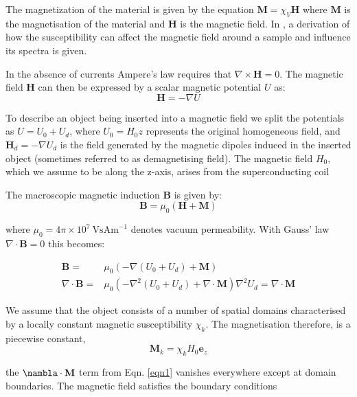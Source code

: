 The magnetization of the material is given by the equation $\mathbf{M} = \chi_V \mathbf{H}$
where $\mathbf{M}$ is the magnetisation of the material and $\mathbf{H}$ is the magnetic field. In
\citep{RN118}, a derivation of how the susceptibility can affect the magnetic field around a sample
and influence its spectra is given.

In the absence of currents Ampere’s law requires that $\nabla \times \mathbf{H} = 0$. The magnetic field $\mathbf{H}$
can then be expressed by a scalar magnetic potential $U$ as:
\begin{equation}
\mathbf{H} = -\nabla U
\end{equation}

To describe an object being inserted into a magnetic field we split the potentials as $U = U_{0}  + U_{d}$, where $U_{0} = H_{0}z$ represents the original homogeneous field, and
$\mathbf{H}_d = - \nabla U_{d}$ is the field generated by the magnetic dipoles induced in the inserted object (sometimes referred to as demagnetising field). The magnetic field $H_{0}$, which we assume to be along the z-axis, arises from the superconducting coil

 The macroscopic magnetic induction $\mathbf{B}$ is given by:
\begin{equation}
  \mathbf{B} = \mu_{0}(\mathbf{H}+\mathbf{M})
\end{equation}

where $\mu_{0} = 4\pi\times10^{7}~\text{VsAm}^{-1}$ denotes vacuum permeability. With Gauss' law $\nabla \cdot \mathbf{B} = 0$ this becomes:

\begin{align}\label{eqn1}
  \mathbf{B} =& \mu_0(-\nabla(U_0 + U_d) + \mathbf{M})\\
  \nabla\cdot\mathbf{B} =& \mu_0(-\nabla^{2}(U_0 + U_d) + \nabla\cdot\mathbf{M})
  \nabla^{2}U_{d} = \nabla \cdot \mathbf{M}
\end{align}

We assume that the object consists of a number of spatial domains characterised by a
locally constant magnetic susceptibility $\chi_{k}$. The magnetisation therefore, is a piecewise
constant,
\begin{equation}
  \mathbf{M}_{k} = \chi_{k}H_{0}\mathbf{e}_{z}
\end{equation}

the $\nambla\cdot\mathbf{M}$ term from Eqn. \ref{eqn1} vanishes everywhere except at domain boundaries. The magnetic
field satisfies the boundary conditions\citep{Jackson:2007uq}


